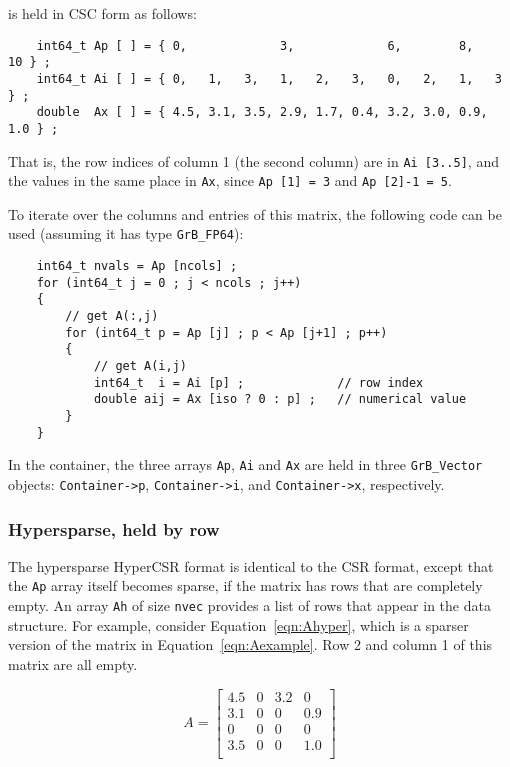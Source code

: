 is held in CSC form as follows:

{\footnotesize
\begin{verbatim}
    int64_t Ap [ ] = { 0,             3,             6,        8,       10 } ;
    int64_t Ai [ ] = { 0,   1,   3,   1,   2,   3,   0,   2,   1,   3   } ;
    double  Ax [ ] = { 4.5, 3.1, 3.5, 2.9, 1.7, 0.4, 3.2, 3.0, 0.9, 1.0 } ; \end{verbatim} }

That is, the row indices of column 1 (the second column) are in
\verb'Ai [3..5]', and the values in the same place in \verb'Ax',
since \verb'Ap [1] = 3' and \verb'Ap [2]-1 = 5'.

To iterate over the columns and entries of this matrix, the following code can
be used (assuming it has type \verb'GrB_FP64'):

    {\footnotesize
    \begin{verbatim}
    int64_t nvals = Ap [ncols] ;
    for (int64_t j = 0 ; j < ncols ; j++)
    {
        // get A(:,j)
        for (int64_t p = Ap [j] ; p < Ap [j+1] ; p++)
        {
            // get A(i,j)
            int64_t  i = Ai [p] ;             // row index
            double aij = Ax [iso ? 0 : p] ;   // numerical value
        }
    } \end{verbatim}}

In the container, the three arrays \verb'Ap', \verb'Ai' and \verb'Ax'
are held in three \verb'GrB_Vector' objects:
\verb'Container->p',
\verb'Container->i', and
\verb'Container->x', respectively.

\subsubsection{Hypersparse, held by row}
\label{format_hypersparse_by_row}

The hypersparse HyperCSR format is identical to the CSR format, except that the
\verb'Ap' array itself becomes sparse, if the matrix has rows that are
completely empty.  An array \verb'Ah' of size \verb'nvec' provides a list of
rows that appear in the data structure.  For example, consider
Equation~\ref{eqn:Ahyper}, which is a sparser version of the matrix in
Equation~\ref{eqn:Aexample}.  Row 2 and column 1 of this matrix are all empty.

    \begin{equation}
    \label{eqn:Ahyper}
    A = \left[
    \begin{array}{cccc}
    4.5 &   0 & 3.2 &   0 \\
    3.1 &   0 &  0  & 0.9 \\
     0  &   0 &  0  &   0 \\
    3.5 &   0 &  0  & 1.0 \\
    \end{array}
    \right]
    \end{equation}

